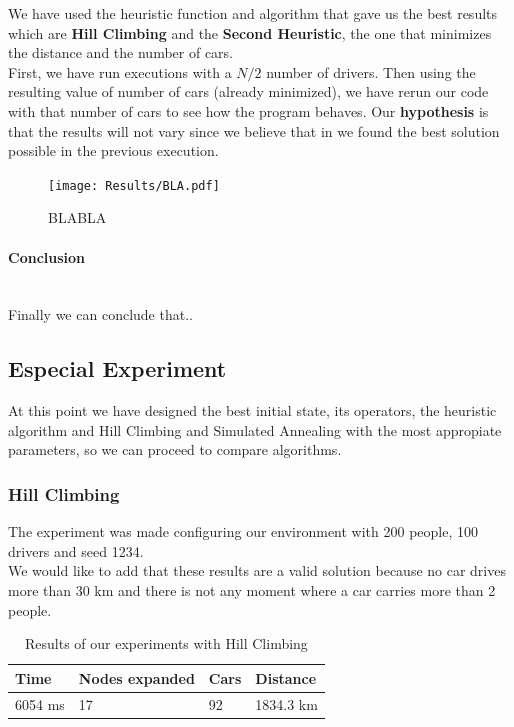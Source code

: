 \documentclass[12]{article}
\begin{document}
We have used the heuristic function and algorithm that gave us the best results which are \textbf{Hill Climbing} and the \textbf{Second Heuristic}, the one that minimizes the distance and the number of cars.
\\

First, we have run executions with a $N/2$ number of drivers. Then using the resulting value of number of cars (already minimized), we have rerun our code with that number of cars to see how the program behaves. Our \textbf{hypothesis} is that the results will not vary since we believe that in we found the best solution possible in the previous execution. 


\begin{figure}[H]
  \captionsetup{justification=centering}
   \centering
    \texttt{[image: Results/BLA.pdf]}
      \caption{BLABLA}
      \label{fig:BLABLA}
  \end{figure}
    \vspace{1cm}
    
 
    

\paragraph{Conclusion}\mbox{}\\

Finally we can conclude that..

\subsection{Especial Experiment}

At this point we have designed the best initial state, its operators, the heuristic algorithm and Hill Climbing and Simulated Annealing with the most appropiate parameters, so we can proceed to compare algorithms. 


\subsubsection{Hill Climbing}

The experiment was made configuring our environment with 200 people, 100 drivers and seed 1234.
\\

We would like to add that these results are a valid solution because no car drives more than 30 km and there is not any moment where a car carries more than 2 people. 
\\

\begin{table}[h]
\centering
\begin{tabular}{|l|l|l|l|}
\hline \textbf{Time} &
 \textbf{Nodes expanded} & \textbf{Cars} & \textbf{Distance}\\  \hline
6054 ms &  17 & 92 & 1834.3 km \\ \hline
\end{tabular}
\caption{Results of our experiments with Hill Climbing}
\label{Results}
\end{table}
\end{document}
